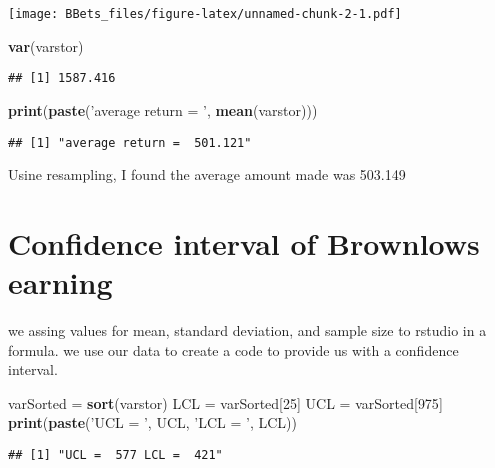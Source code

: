 \documentclass[]{article}
\newenvironment{Shaded}{\begin{snugshade}}{\end{snugshade}}
\newcommand{\KeywordTok}[1]{\textcolor[rgb]{0.13,0.29,0.53}{\textbf{#1}}}
\newcommand{\DecValTok}[1]{\textcolor[rgb]{0.00,0.00,0.81}{#1}}
\newcommand{\StringTok}[1]{\textcolor[rgb]{0.31,0.60,0.02}{#1}}
\newcommand{\NormalTok}[1]{#1}
\begin{document}
\texttt{[image: BBets\_files/figure-latex/unnamed-chunk-2-1.pdf]}

\begin{Shaded}
\begin{Highlighting}[]
\KeywordTok{var}\NormalTok{(varstor)}
\end{Highlighting}
\end{Shaded}

\begin{verbatim}
## [1] 1587.416
\end{verbatim}

\begin{Shaded}
\begin{Highlighting}[]
\KeywordTok{print}\NormalTok{(}\KeywordTok{paste}\NormalTok{(}\StringTok{'average return = '}\NormalTok{, }\KeywordTok{mean}\NormalTok{(varstor)))}
\end{Highlighting}
\end{Shaded}

\begin{verbatim}
## [1] "average return =  501.121"
\end{verbatim}

Usine resampling, I found the average amount made was 503.149

\section{Confidence interval of Brownlows
earning}\label{confidence-interval-of-brownlows-earning}

we assing values for mean, standard deviation, and sample size to
rstudio in a formula. we use our data to create a code to provide us
with a confidence interval.

\begin{Shaded}
\begin{Highlighting}[]
\NormalTok{varSorted =}\StringTok{ }\KeywordTok{sort}\NormalTok{(varstor)}
\NormalTok{LCL =}\StringTok{ }\NormalTok{varSorted[}\DecValTok{25}\NormalTok{]}
\NormalTok{UCL =}\StringTok{ }\NormalTok{varSorted[}\DecValTok{975}\NormalTok{]}
\KeywordTok{print}\NormalTok{(}\KeywordTok{paste}\NormalTok{(}\StringTok{'UCL = '}\NormalTok{, UCL, }\StringTok{'LCL = '}\NormalTok{, LCL))}
\end{Highlighting}
\end{Shaded}

\begin{verbatim}
## [1] "UCL =  577 LCL =  421"
\end{verbatim}
\end{document}
